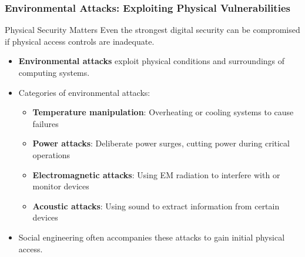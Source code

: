 \documentclass{beamer}
\begin{document}
\begin{frame}
    \frametitle{Environmental Attacks: Exploiting Physical Vulnerabilities}
    
    \begin{alertblock}{Physical Security Matters}
        Even the strongest digital security can be compromised if physical access controls are inadequate.
    \end{alertblock}
    
    \begin{itemize}
        \item \textbf{Environmental attacks} exploit physical conditions and surroundings of computing systems.
        \item Categories of environmental attacks:
            \begin{itemize}
                \item \textbf{Temperature manipulation}: Overheating or cooling systems to cause failures
                \item \textbf{Power attacks}: Deliberate power surges, cutting power during critical operations
                \item \textbf{Electromagnetic attacks}: Using EM radiation to interfere with or monitor devices
                \item \textbf{Acoustic attacks}: Using sound to extract information from certain devices
            \end{itemize}
        \item Social engineering often accompanies these attacks to gain initial physical access.
    \end{itemize}
\end{frame}
\end{document}

